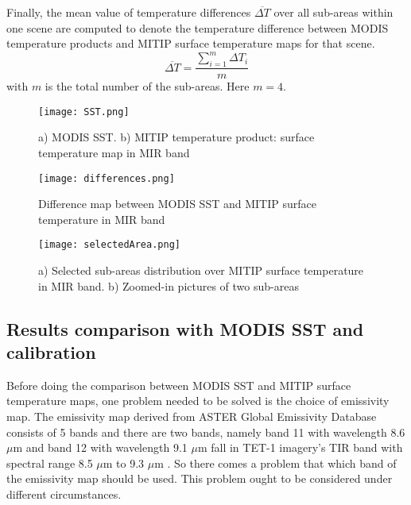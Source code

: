 \noindent Finally, the mean value of temperature differences $\overline{\Delta T}$ over all sub-areas within one scene are computed to denote the temperature difference between MODIS temperature products and MITIP surface temperature maps for that scene.\\
\begin{equation}
\label{eq1}
\overline{\Delta T} =\frac{\sum_{i=1}^m \Delta T_i}{m}
\end{equation}
with $m$ is the total number of the sub-areas. Here $m = 4$.

\begin{figure}[!htbp]
\centering\texttt{[image: SST.png]}
\caption{a) MODIS SST. b) MITIP temperature product: surface temperature map in MIR band}
\label{fig:SST}
\end {figure}

\begin{figure}[!htbp]
\centering\texttt{[image: differences.png]}
\caption{Difference map between MODIS SST and MITIP surface temperature in MIR band}
\label{fig:Diff}
\end{figure}

\begin{figure}[!htbp]
\centering\texttt{[image: selectedArea.png]}
\caption{a) Selected sub-areas distribution over MITIP surface temperature in MIR band. b) Zoomed-in pictures of two sub-areas}
\label{fig:selectedArea}
\end{figure}


\subsection{Results comparison with MODIS SST and calibration}
Before doing the comparison between MODIS SST and MITIP surface temperature maps, one problem needed to be solved is the choice of emissivity map. The emissivity map derived from ASTER Global Emissivity Database consists of 5 bands and there are two bands, namely band 11 with wavelength 8.6 $\mu$m and band 12 with wavelength 9.1 $\mu$m fall in TET-1 imagery's TIR band with spectral range 8.5 $\mu$m to 9.3 $\mu$m \parencite{Reference306}. So there comes a problem that which band of the emissivity map should be used. This problem ought to be considered under different circumstances.\\

